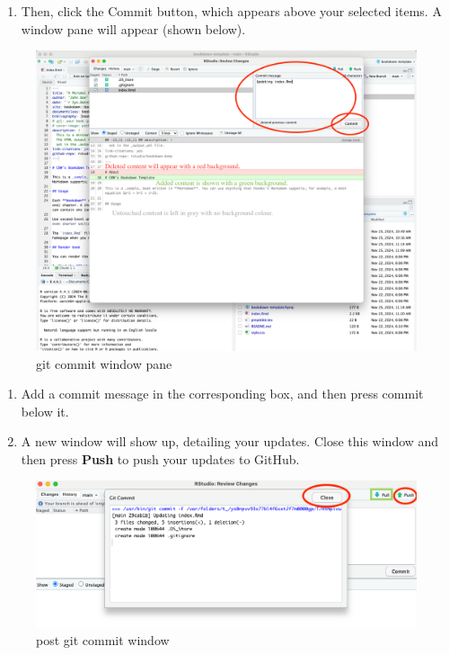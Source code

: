 \documentclass[
]{book}
\providecommand{\tightlist}{%
  \setlength{\itemsep}{0pt}\setlength{\parskip}{0pt}}
\theoremstyle{definition}
\theoremstyle{definition}
\theoremstyle{definition}
\theoremstyle{definition}
\theoremstyle{remark}
\begin{document}
\begin{enumerate}
\def\labelenumi{\arabic{enumi}.}
\setcounter{enumi}{13}
\tightlist
\item
  Then, click the Commit button, which appears above your selected items. A window pane will appear (shown below).
\end{enumerate}

\begin{figure}
\centering
\includegraphics{img/git-instruct/git-commit-window.png}
\caption{git commit window pane}
\end{figure}

\begin{enumerate}
\def\labelenumi{\arabic{enumi}.}
\setcounter{enumi}{14}
\item
  Add a commit message in the corresponding box, and then press commit below it.
\item
  A new window will show up, detailing your updates. Close this window and then press \textbf{Push} to push your updates to GitHub.
\end{enumerate}

\begin{figure}
\centering
\includegraphics{img/git-instruct/git-window-post-commit.png}
\caption{post git commit window}
\end{figure}
\end{document}
